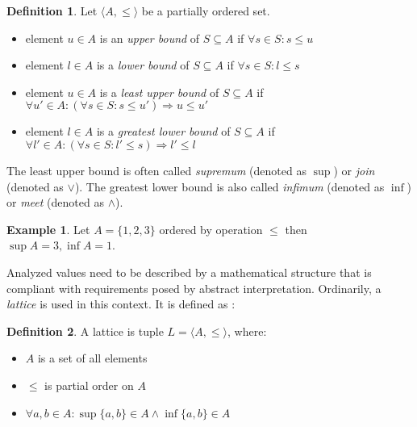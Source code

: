 \documentclass[12pt,final,oneside]{fithesis2}
\theoremstyle{definition}
\newtheorem{definition}{Definition}
\newtheorem{example}{Example}
\begin{document}
\begin{definition}
Let $\langle A, \leq \rangle$ be a partially ordered set.

\begin{itemize}

\item element $u \in A$ is an \textit{upper bound} of $S \subseteq A$ if
$\forall s \in S : s \leq u$

\item element $l \in A$ is a \textit{lower bound} of $S \subseteq A$ if
$\forall s \in S : l \leq s$

\item element $u \in A$ is a \textit{least upper bound} of $S \subseteq A$
if $\forall u' \in A : (\forall s \in S : s \leq u') \Rightarrow u \leq u'$

\item element $l \in A$ is a \textit{greatest lower bound} of $S \subseteq A$
if $\forall l' \in A : (\forall s \in S : l' \leq s) \Rightarrow l' \leq l$

\end{itemize}

The least upper bound is often called \textit{supremum} (denoted as $\sup$)
or \textit{join} (denoted as $\lor$). The greatest lower bound is also
called \textit{infimum} (denoted as $\inf$) or \textit{meet} (denoted as
$\land$).
\end{definition}

\begin{example}
Let $A = \{ 1, 2, 3 \}$ ordered by operation $\leq$ then
$\sup A = 3, \inf A = 1$.
\end{example}

Analyzed values need to be described by a mathematical structure that is
compliant with requirements posed by abstract interpretation. Ordinarily,
a \textit{lattice} is used in this context. It is defined as
\cite{Burris81-1}:

\begin{definition}
A lattice is tuple $L = \langle A, \leq \rangle$, where:

\begin{itemize}
\item $A$ is a set of all elements
\item $\leq$ is partial order on $A$
\item $\forall a, b \in A : \sup \{ a, b \} \in A \land \inf \{ a, b \} \in A$
\end{itemize}
\end{definition}
\end{document}
